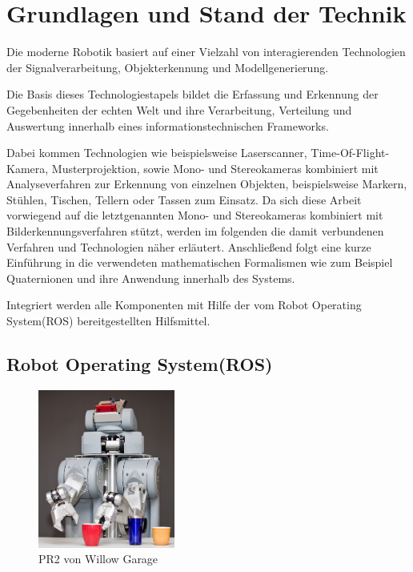 \chapter{Grundlagen und Stand der Technik}\label{ch:grundlagen}

Die moderne Robotik basiert auf einer Vielzahl von interagierenden Technologien der Signalverarbeitung, Objekterkennung und Modellgenerierung.

Die Basis dieses Technologiestapels bildet die Erfassung und Erkennung der Gegebenheiten der echten Welt und ihre Verarbeitung, Verteilung und Auswertung innerhalb eines informationstechnischen Frameworks.

Dabei kommen Technologien wie beispielsweise Laserscanner, Time-Of-Flight-Kamera, Musterprojektion, sowie Mono- und Stereokameras kombiniert mit Analyseverfahren zur Erkennung von einzelnen Objekten, beispielsweise Markern, Stühlen, Tischen, Tellern oder Tassen zum Einsatz.
Da sich diese Arbeit vorwiegend auf die letztgenannten Mono- und Stereokameras kombiniert mit Bilderkennungsverfahren stützt, werden im folgenden die damit verbundenen Verfahren und Technologien näher erläutert.
Anschließend folgt eine kurze Einführung in die verwendeten mathematischen Formalismen wie zum Beispiel Quaternionen und ihre Anwendung innerhalb des Systems.

Integriert werden alle Komponenten mit Hilfe der vom Robot Operating System(ROS) bereitgestellten Hilfsmittel.

\section{Robot Operating System(ROS)}

\begin{figure}
  \centering
  \includegraphics[width=0.4\textwidth]{bilder/pr2.jpg}
  \caption{PR2 von Willow Garage}
  \label{fig:pr2}
\end{figure}

